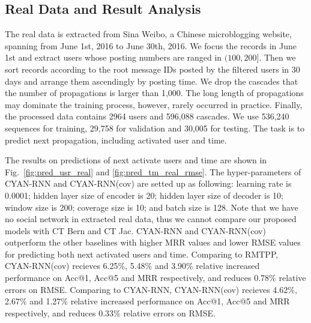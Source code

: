 

\subsection{Real Data and Result Analysis}

The real data is extracted from Sina Weibo, a Chinese microblogging website,
spanning from June 1st, 2016 to June 30th, 2016. We focus the records in June
1st and extract users whose posting numbers are ranged in $(100,
200]$. Then we sort records according to the root
message IDs posted by the filtered users in 30 days and arrange them ascendingly
by posting time. We drop the cascades that the number of propagations is larger
than 1,000. The long length of propagations may dominate the training process,
however, rarely occurred in practice. 
Finally, the processed data contains 2964 users and 596,088 cascades. 
We use 536,240 sequences for training, 29,758 for validation and 30,005 for
testing. The task is to predict next propagation, including activated user and
time. 

The results on predictions of next
activate users and time are shown in Fig.~\ref{fig:pred_usr_real} and
\ref{fig:pred_tm_real_rmse}. The hyper-parameters of CYAN-RNN and CYAN-RNN(cov)
are setted up as following: learning rate is 0.0001; hidden layer size of
encoder is 20; hidden layer size of decoder is 10; window size is 200; coverage
size is 10; and batch size is 128. Note that we have no social
network in extracted real data, thus we cannot compare our proposed models with
CT Bern and CT Jac. CYAN-RNN and CYAN-RNN(cov) outperform the other baselines
with higher MRR values and lower RMSE values for predicting both next activated
users and time. Comparing to RMTPP, CYAN-RNN(cov) recieves 6.25\%, 5.48\% and
3.90\% relative increased performance on Acc@1, Acc@5 and MRR respectively, and
reduces 0.78\% relative errors on RMSE. Comparing to CYAN-RNN, CYAN-RNN(cov)
recieves 4.62\%, 2.67\% and 1.27\% relative increased performance on Acc@1,
Acc@5 and MRR respectively, and reduces 0.33\% relative errors on RMSE.



